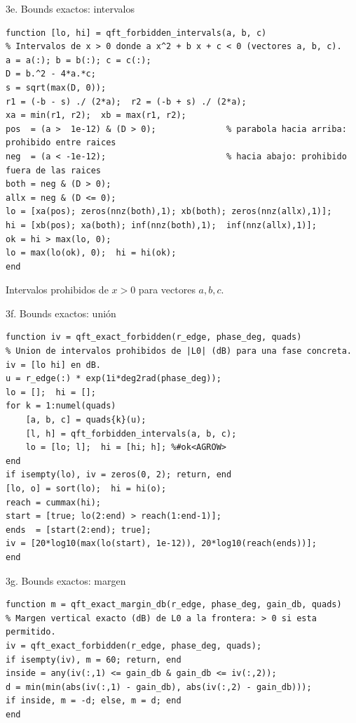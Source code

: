 \documentclass[aspectratio=169,11pt]{beamer}
\begin{document}
\begin{frame}[fragile]{3e. Bounds exactos: intervalos}
\scriptsize
\begin{verbatim}
function [lo, hi] = qft_forbidden_intervals(a, b, c)
% Intervalos de x > 0 donde a x^2 + b x + c < 0 (vectores a, b, c).
a = a(:); b = b(:); c = c(:);
D = b.^2 - 4*a.*c;
s = sqrt(max(D, 0));
r1 = (-b - s) ./ (2*a);  r2 = (-b + s) ./ (2*a);
xa = min(r1, r2);  xb = max(r1, r2);
pos  = (a >  1e-12) & (D > 0);              % parabola hacia arriba: prohibido entre raices
neg  = (a < -1e-12);                        % hacia abajo: prohibido fuera de las raices
both = neg & (D > 0);
allx = neg & (D <= 0);
lo = [xa(pos); zeros(nnz(both),1); xb(both); zeros(nnz(allx),1)];
hi = [xb(pos); xa(both); inf(nnz(both),1);  inf(nnz(allx),1)];
ok = hi > max(lo, 0);
lo = max(lo(ok), 0);  hi = hi(ok);
end
\end{verbatim}
\footnotesize Intervalos prohibidos de $x>0$ para vectores $a,b,c$.
\end{frame}

\begin{frame}[fragile]{3f. Bounds exactos: unión}
\scriptsize
\begin{verbatim}
function iv = qft_exact_forbidden(r_edge, phase_deg, quads)
% Union de intervalos prohibidos de |L0| (dB) para una fase concreta. iv = [lo hi] en dB.
u = r_edge(:) * exp(1i*deg2rad(phase_deg));
lo = [];  hi = [];
for k = 1:numel(quads)
    [a, b, c] = quads{k}(u);
    [l, h] = qft_forbidden_intervals(a, b, c);
    lo = [lo; l];  hi = [hi; h]; %#ok<AGROW>
end
if isempty(lo), iv = zeros(0, 2); return, end
[lo, o] = sort(lo);  hi = hi(o);
reach = cummax(hi);
start = [true; lo(2:end) > reach(1:end-1)];
ends  = [start(2:end); true];
iv = [20*log10(max(lo(start), 1e-12)), 20*log10(reach(ends))];
end
\end{verbatim}
\end{frame}

\begin{frame}[fragile]{3g. Bounds exactos: margen}
\footnotesize
\begin{verbatim}
function m = qft_exact_margin_db(r_edge, phase_deg, gain_db, quads)
% Margen vertical exacto (dB) de L0 a la frontera: > 0 si esta permitido.
iv = qft_exact_forbidden(r_edge, phase_deg, quads);
if isempty(iv), m = 60; return, end
inside = any(iv(:,1) <= gain_db & gain_db <= iv(:,2));
d = min(min(abs(iv(:,1) - gain_db), abs(iv(:,2) - gain_db)));
if inside, m = -d; else, m = d; end
end
\end{verbatim}
\end{frame}
\end{document}
